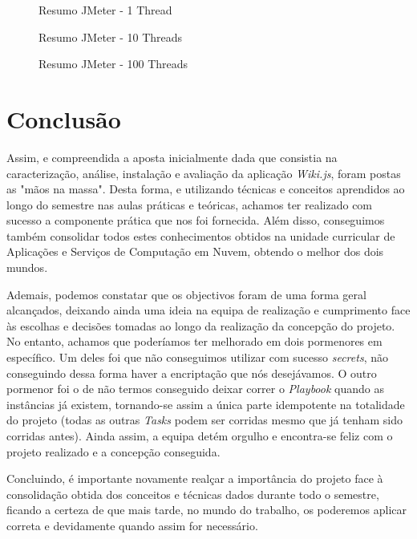 \documentclass[11pt]{article}
\begin{document}
\begin{figure}[H]
    \centering
    \caption {Resumo JMeter - 1 Thread}
\end{figure}

\begin{figure}[H]
    \centering
    \caption {Resumo JMeter - 10 Threads}
\end{figure}

\begin{figure}[H]
    \centering
    \caption {Resumo JMeter - 100 Threads}
\end{figure}


\clearpage
\section{Conclusão}

Assim, e compreendida a aposta inicialmente dada que consistia na caracterização, análise, instalação e avaliação da aplicação \textit{Wiki.js}, foram postas as "mãos na massa". Desta forma, e utilizando técnicas e conceitos aprendidos ao longo do semestre nas aulas práticas e teóricas, achamos ter realizado com sucesso a componente prática que nos foi fornecida. Além disso, conseguimos também consolidar todos estes conhecimentos obtidos na unidade curricular de Aplicações e Serviços de Computação em Nuvem, obtendo o melhor dos dois mundos.

Ademais, podemos constatar que os objectivos foram de uma forma geral alcançados, deixando ainda uma ideia na equipa de realização e cumprimento face às escolhas e decisões tomadas ao longo da realização da concepção do projeto. No entanto, achamos que poderíamos ter melhorado em dois pormenores em específico. Um deles foi que não conseguimos utilizar com sucesso \textit{secrets}, não conseguindo dessa forma haver a encriptação que nós desejávamos. O outro pormenor foi o de não termos conseguido deixar correr o \textit{Playbook} quando as instâncias já existem, tornando-se assim a única parte idempotente na totalidade do projeto (todas as outras \textit{Tasks} podem ser corridas mesmo que já tenham sido corridas antes). Ainda assim, a equipa detém orgulho e encontra-se feliz com o projeto realizado e a concepção conseguida.

Concluindo, é importante novamente realçar a importância do projeto face à consolidação obtida dos conceitos e técnicas dados durante todo o semestre, ficando a certeza de que mais tarde, no mundo do trabalho, os poderemos aplicar correta e devidamente quando assim for necessário.
\end{document}
